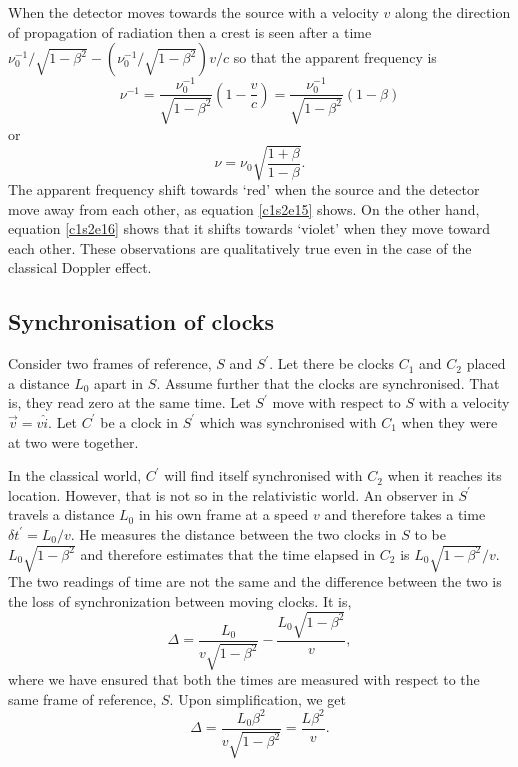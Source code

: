 When the detector moves towards the source with a velocity $v$ along the 
direction of propagation of radiation then a crest is seen after a time 
$\nu_0^{-1}/\sqrt{1 - \beta^2} - (\nu_0^{-1}/\sqrt{1 - \beta^2})v/c$ so that the 
apparent frequency is
\[
\nu^{-1} = \frac{\nu_0^{-1}}{\sqrt{1 - \beta^2}}\left(1 - \frac{v}{c}\right) = 
\frac{\nu_0^{-1}}{\sqrt{1 - \beta^2}}(1 - \beta)
\]
or
\begin{equation}\label{c1s2e16}
\nu = \nu_0\sqrt{\frac{1 + \beta}{1 - \beta}}.
\end{equation}
The apparent frequency shift towards `red' when the source and the detector move
away from each other, as equation \eqref{c1s2e15} shows. On the other hand,
equation \eqref{c1s2e16} shows that it shifts towards `violet' when they move 
toward each other. These observations are qualitatively true even in the case of
the classical Doppler effect.

\subsection{Synchronisation of clocks}
Consider two frames of reference, $S$ and $S^\prime$. Let there be clocks $C_1$
and $C_2$ placed a distance $L_0$ apart in $S$. Assume further that the clocks 
are synchronised. That is, they read zero at the same time. Let $S^\prime$ move
with respect to $S$ with a velocity $\vec{v} = v\hat{i}$. Let $C^\prime$ be a 
clock in $S^\prime$ which was synchronised with $C_1$ when they were at two were 
together.

In the classical world, $C^\prime$ will find itself synchronised with $C_2$ when
it reaches its location. However, that is not so in the relativistic world. An 
observer in $S^\prime$ travels a distance $L_0$ in his own frame at a speed $v$
and therefore takes a time $\delta t^\prime = L_0/v$. He measures the distance 
between the two clocks in $S$ to be $L_0\sqrt{1 - \beta^2}$ and therefore 
estimates that the time elapsed in $C_2$ is $L_0\sqrt{1 - \beta^2}/v$. The two
readings of time are not the same and the difference between the two is the loss
of synchronization between moving clocks. It is,
\begin{equation}\label{c1s2e17}
\Delta = \frac{L_0}{v\sqrt{1 - \beta^2}} - \frac{L_0\sqrt{1 - \beta^2}}{v},
\end{equation}
where we have ensured that both the times are measured with respect to the same
frame of reference, $S$. Upon simplification, we get
\begin{equation}\label{c1s2e18}
\Delta = \frac{L_0\beta^2}{v\sqrt{1 - \beta^2}} = \frac{L\beta^2}{v}.
\end{equation}

